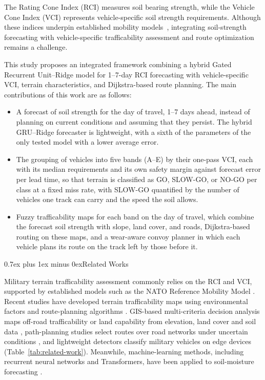 \documentclass[conference]{IEEEtran}
\makeatletter
\def\section{\needspace{7\baselineskip}\@startsection{section}{1}{\z@}{2.5ex plus 1ex minus 0.5ex}%
{0.7ex plus 1ex minus 0ex}{\normalfont\normalsize\centering\scshape}}
\makeatother
\begin{document}
The Rating Cone Index (RCI) measures soil bearing strength, while the Vehicle Cone Index (VCI) represents vehicle-specific soil strength requirements. Although these indices underpin established mobility models~\cite{rula1971,haley1979}, integrating soil-strength forecasting with vehicle-specific trafficability assessment and route optimization remains a challenge.

This study proposes an integrated framework combining a hybrid Gated Recurrent Unit–Ridge model for 1–7-day RCI forecasting with vehicle-specific VCI, terrain characteristics, and Dijkstra-based route planning. The main contributions of this work are as follows:
\begin{itemize}
  \item A forecast of soil strength for the day of travel, 1–7 days ahead, instead of planning on current conditions and assuming that they persist. The hybrid GRU–Ridge forecaster is lightweight, with a sixth of the parameters of the only tested model with a lower average error.
  \item The grouping of vehicles into five bands (A--E) by their one-pass VCI, each with its median requirements and its own safety margin against forecast error per lead time, so that terrain is classified as GO, SLOW-GO, or NO-GO per class at a fixed miss rate, with SLOW-GO quantified by the number of vehicles one track can carry and the speed the soil allows.
  \item Fuzzy trafficability maps for each band on the day of travel, which combine the forecast soil strength with slope, land cover, and roads, Dijkstra-based routing on these maps, and a wear-aware convoy planner in which each vehicle plans its route on the track left by those before it.
\end{itemize}

\section{Related Works}

Military terrain trafficability assessment commonly relies on the RCI and VCI, supported by established models such as the NATO Reference Mobility Model \cite{haley1979,rula1971,ciobotaru2009}. Recent studies have developed terrain trafficability maps using environmental factors and route-planning algorithms \cite{liu2025}. GIS-based multi-criteria decision analysis maps off-road trafficability or land capability from elevation, land cover and soil data \cite{khan2021,dutta2024,mema2026}, path-planning studies select routes over road networks under uncertain conditions \cite{gao2019,xu2025}, and lightweight detectors classify military vehicles on edge devices \cite{gupta2022} (Table~\ref{tab:related-work}). Meanwhile, machine-learning methods, including recurrent neural networks and Transformers, have been applied to soil-moisture forecasting \cite{wang2024hess,wang2024agwat}.
\end{document}
